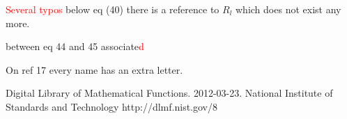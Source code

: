 \documentclass[aps,prb,floats,floatfix,twocolumn]{revtex4}
\newcommand{\rmrk}[1]{\textcolor{red}{#1}}
\begin{document}
\rmrk{Several typos}
below eq (40) there is a reference to  $R_l$ which does not exist any more.


between eq 44 and 45 associate\rmrk{d}


On ref 17 every name has an extra letter.




\begin{thebibliography}{99}
Digital Library of Mathematical Functions. 2012-03-23. National Institute of Standards and Technology  http://dlmf.nist.gov/8



\end{thebibliography}
\end{document}
